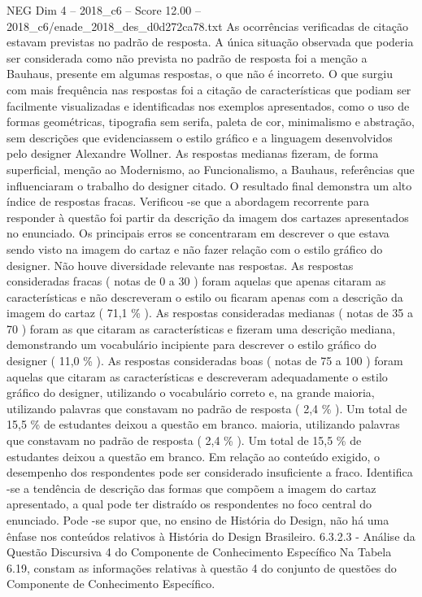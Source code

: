 \begin{textsample}{NEG Dim 4 – 2018\_c6 – Score 12.00 – 2018\_c6/enade\_2018\_des\_d0d272ca78.txt}
As ocorrências verificadas de citação estavam previstas no padrão de resposta.
A única situação observada que poderia ser considerada como não prevista no padrão de resposta foi a menção a Bauhaus, presente em algumas respostas, o que não é incorreto.
O que surgiu com mais frequência nas respostas foi a citação de características que podiam ser facilmente visualizadas e identificadas nos exemplos apresentados, como o uso de formas geométricas, tipografia sem serifa, paleta de cor, minimalismo e abstração, sem descrições que evidenciassem o estilo gráfico e a linguagem desenvolvidos pelo designer Alexandre Wollner.
As respostas medianas fizeram, de forma superficial, menção ao Modernismo, ao Funcionalismo, a Bauhaus, referências que influenciaram o trabalho do designer citado.
O resultado final demonstra um alto índice de respostas fracas.
Verificou -se que a abordagem recorrente para responder à questão foi partir da descrição da imagem dos cartazes apresentados no enunciado.
Os principais erros se concentraram em descrever o que estava sendo visto na imagem do cartaz e não fazer relação com o estilo gráfico do designer.
Não houve diversidade relevante nas respostas.
As respostas consideradas fracas ( notas de 0 a 30 ) foram aquelas que apenas citaram as características e não descreveram o estilo ou ficaram apenas com a descrição da imagem do cartaz ( 71,1 \% ).
As respostas consideradas medianas ( notas de 35 a 70 ) foram as que citaram as características e fizeram uma descrição mediana, demonstrando um vocabulário incipiente para descrever o estilo gráfico do designer ( 11,0 \% ).
As respostas consideradas boas ( notas de 75 a 100 ) foram aquelas que citaram as características e descreveram adequadamente o estilo gráfico do designer, utilizando o vocabulário correto e, na grande maioria, utilizando palavras que constavam no padrão de resposta ( 2,4 \% ).
Um total de 15,5 \% de estudantes deixou a questão em branco. maioria, utilizando palavras que constavam no padrão de resposta ( 2,4 \% ).
Um total de 15,5 \% de estudantes deixou a questão em branco.
Em relação ao conteúdo exigido, o desempenho dos respondentes pode ser considerado insuficiente a fraco.
Identifica -se a tendência de descrição das formas que compõem a imagem do cartaz apresentado, a qual pode ter distraído os respondentes no foco central do enunciado.
Pode -se supor que, no ensino de História do Design, não há uma ênfase nos conteúdos relativos à História do Design Brasileiro. 6.3.2.3 - Análise da Questão Discursiva 4 do Componente de Conhecimento Específico Na Tabela 6.19, constam as informações relativas à questão 4 do conjunto de questões do Componente de Conhecimento Específico.

\end{textsample}
